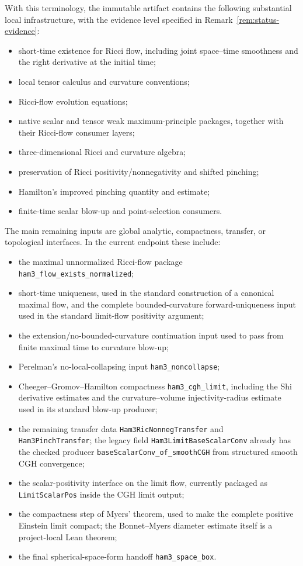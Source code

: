 \documentclass[11pt]{article}
\theoremstyle{plain}
\theoremstyle{definition}
\theoremstyle{remark}
\newcommand{\leanref}[1]{\nolinkurl{#1}}
\begin{document}
With this terminology, the immutable artifact contains the following
substantial local infrastructure, with the evidence level specified in
Remark~\ref{rem:status-evidence}:
\begin{itemize}[leftmargin=2em]
  \item short-time existence for Ricci flow, including joint space--time
    smoothness and the right derivative at the initial time;
  \item local tensor calculus and curvature conventions;
  \item Ricci-flow evolution equations;
  \item native scalar and tensor weak maximum-principle packages, together
    with their Ricci-flow consumer layers;
  \item three-dimensional Ricci and curvature algebra;
  \item preservation of Ricci positivity/nonnegativity and shifted pinching;
  \item Hamilton's improved pinching quantity and estimate;
  \item finite-time scalar blow-up and point-selection consumers.
\end{itemize}
The main remaining inputs are global analytic, compactness, transfer, or
topological interfaces.  In the current endpoint these include:
\begin{itemize}[leftmargin=2em]
  \item the maximal unnormalized Ricci-flow package
    \leanref{ham3_flow_exists_normalized};
  \item short-time uniqueness, used in the standard construction of a
    canonical maximal flow, and the
    complete bounded-curvature forward-uniqueness input used in the standard
    limit-flow positivity argument;
  \item the extension/no-bounded-curvature continuation input used to pass from
    finite maximal time to curvature blow-up;
  \item Perelman's no-local-collapsing input \leanref{ham3_noncollapse};
  \item Cheeger--Gromov--Hamilton compactness \leanref{ham3_cgh_limit},
    including the Shi derivative estimates and the curvature--volume
    injectivity-radius estimate used in its standard blow-up producer;
  \item the remaining transfer data
    \leanref{Ham3RicNonnegTransfer} and
    \leanref{Ham3PinchTransfer}; the legacy field
    \leanref{Ham3LimitBaseScalarConv} already has the checked producer
    \leanref{baseScalarConv_of_smoothCGH} from structured smooth CGH
    convergence;
  \item the scalar-positivity interface on the limit flow, currently packaged
    as \leanref{LimitScalarPos} inside the CGH limit output;
  \item the compactness step of Myers' theorem, used to make the complete
    positive Einstein limit compact; the Bonnet--Myers diameter estimate
    itself is a project-local Lean theorem;
  \item the final spherical-space-form handoff
    \leanref{ham3_space_box}.
\end{itemize}
\end{document}
